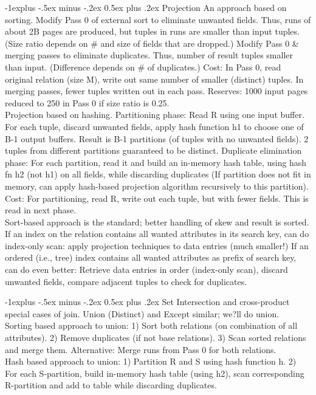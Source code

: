 \documentclass[12pt,landscape]{article}
\makeatletter
\renewcommand{\subsection}{\@startsection{subsection}{2}{0mm}%
                                {-1explus -.5ex minus -.2ex}%
                                {0.5ex plus .2ex}%
                                {\normalfont\normalsize\bfseries}}
\makeatother
\begin{document}
\begin{multicols}{3}
\subsection{Projection}
An approach based on sorting. Modify Pass 0 of external sort to eliminate unwanted fields. Thus, runs of about 2B pages are produced, but tuples in runs are smaller than input tuples. (Size ratio depends on \# and size of fields that are dropped.) Modify Pass 0 \& merging passes to eliminate duplicates. Thus, number of result tuples smaller than input. (Difference depends on \# of duplicates.) Cost: In Pass 0, read original relation (size M), write out same number of smaller (distinct) tuples. In merging passes, fewer tuples written out in each pass. Reserves: 1000 input pages reduced to 250 in Pass 0 if size ratio is 0.25. \\
Projection based on hashing. Partitioning phase: Read R using one input buffer. For each tuple, discard unwanted fields, apply hash function h1 to choose one of B-1 output buffers. Result is B-1 partitions (of tuples with no unwanted fields). 2 tuples from different partitions guaranteed to be distinct. Duplicate elimination phase: For each partition, read it and build an in-memory hash table, using hash fn h2 (not h1) on all fields, while discarding duplicates (If partition does not fit in memory, can apply hash-based projection algorithm recursively to this partition). Cost: For partitioning, read R, write out each tuple, but with fewer fields. This is read in next phase. \\
Sort-based approach is the standard; better handling of skew and result is sorted. If an index on the relation contains all wanted attributes in its search key, can do index-only scan: apply projection techniques to data entries (much smaller!) If an ordered (i.e., tree) index contains all wanted attributes as prefix of search key, can do even better: Retrieve data entries in order (index-only scan), discard unwanted fields, compare adjacent tuples to check for duplicates.

\subsection{Set}
Intersection and cross-product special cases of join. Union (Distinct) and Except similar; we?ll do union. \\
Sorting based approach to union: 1) Sort both relations (on combination of all attributes). 2) Remove duplicates (if not base relations). 3) Scan sorted relations and merge them. Alternative: Merge runs from Pass 0 for both relations. \\
Hash based approach to union: 1) Partition R and S using hash function h. 2) For each S-partition, build in-memory hash table (using h2), scan corresponding R-partition and add to table while discarding duplicates.


\end{multicols}
\end{document}
